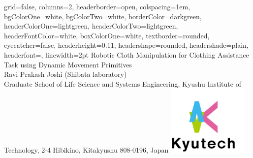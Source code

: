 \documentclass[a0paper,portrait]{baposter}
\begin{document}

\begin{poster}{
		grid=false,
		columns=2, %
		headerborder=open, %
		colspacing=1em, %
		bgColorOne=white, %
		bgColorTwo=white, %
		borderColor=darkgreen, %
		headerColorOne=lightgreen, %
		headerColorTwo=lightgreen, %
		headerFontColor=white, %
		boxColorOne=white, %
		textborder=rounded, %
		eyecatcher=false, %
		headerheight=0.11\textheight, %
		headershape=rounded, %
		headershade=plain,
		headerfont=\Large\textsf, %
		linewidth=2pt %
		}{}
	{\vspace{1em}
		\textsf %
		{Robotic Cloth Manipulation for Clothing Assistance Task using Dynamic Movement Primitives}
	} %
	{\sf\vspace{0.1em}\\
		Ravi Prakash Joshi (Shibata laboratory)
		\vspace{0.1em}\\
		\small{Graduate School of Life Science and Systems Engineering, Kyushu Institute of Technology, 2-4 Hibikino, Kitakyushu 808-0196, Japan}}
	{\includegraphics[trim={5mm 5mm 30mm 10mm}, clip, width=4cm]{logo}} %
	

\end{poster}
\end{document}
